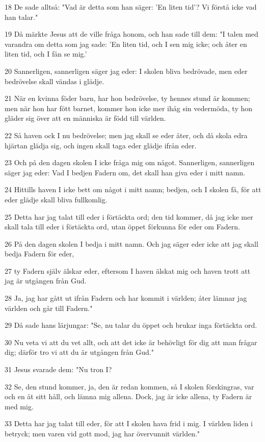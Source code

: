 \par 18 De sade alltså: "Vad är detta som han säger: 'En liten tid'? Vi förstå icke vad han talar."
\par 19 Då märkte Jesus att de ville fråga honom, och han sade till dem: "I talen med varandra om detta som jag sade: 'En liten tid, och I sen mig icke; och åter en liten tid, och I fån se mig.'
\par 20 Sannerligen, sannerligen säger jag eder: I skolen bliva bedrövade, men eder bedrövelse skall vändas i glädje.
\par 21 När en kvinna föder barn, har hon bedrövelse, ty hennes stund är kommen; men när hon har fött barnet, kommer hon icke mer ihåg sin vedermöda, ty hon gläder sig över att en människa är född till världen.
\par 22 Så haven ock I nu bedrövelse; men jag skall se eder åter, och då skola edra hjärtan glädja sig, och ingen skall taga eder glädje ifrån eder.
\par 23 Och på den dagen skolen I icke fråga mig om något. Sannerligen, sannerligen säger jag eder: Vad I bedjen Fadern om, det skall han giva eder i mitt namn.
\par 24 Hittills haven I icke bett om något i mitt namn; bedjen, och I skolen få, för att eder glädje skall bliva fullkomlig.
\par 25 Detta har jag talat till eder i förtäckta ord; den tid kommer, då jag icke mer skall tala till eder i förtäckta ord, utan öppet förkunna för eder om Fadern.
\par 26 På den dagen skolen I bedja i mitt namn. Och jag säger eder icke att jag skall bedja Fadern för eder,
\par 27 ty Fadern själv älskar eder, eftersom I haven älskat mig och haven trott att jag är utgången från Gud.
\par 28 Ja, jag har gått ut ifrån Fadern och har kommit i världen; åter lämnar jag världen och går till Fadern."
\par 29 Då sade hans lärjungar: "Se, nu talar du öppet och brukar inga förtäckta ord.
\par 30 Nu veta vi att du vet allt, och att det icke är behövligt för dig att man frågar dig; därför tro vi att du är utgången från Gud."
\par 31 Jesus svarade dem: "Nu tron I?
\par 32 Se, den stund kommer, ja, den är redan kommen, så I skolen förskingras, var och en åt sitt håll, och lämna mig allena. Dock, jag är icke allena, ty Fadern är med mig.
\par 33 Detta har jag talat till eder, för att I skolen hava frid i mig. I världen liden i betryck; men varen vid gott mod, jag har övervunnit världen."

